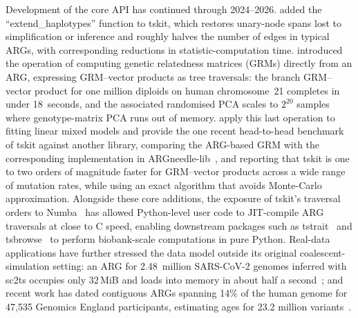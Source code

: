 \documentclass{article}
\begin{document}
Development of the core API has continued through
2024--2026. \citet{fritze2026forest} added the
``extend\_haplotypes'' function to tskit, which restores
unary-node spans lost to simplification or inference and roughly
halves the number of edges in typical ARGs, with corresponding
reductions in statistic-computation time.
\citet{lehmann2026on}
introduced the operation of computing genetic relatedness matrices
(GRMs) directly from an ARG, expressing GRM--vector products as
tree traversals: the branch GRM--vector product for
one million diploids on human chromosome~21 completes in
under 18~seconds, and the associated randomised PCA scales to
$2^{20}$ samples where genotype-matrix PCA runs out of memory.
\citet{lee2026genetic} apply this
last operation to fitting linear mixed models and provide the one recent
head-to-head benchmark of tskit against another library,
comparing the ARG-based GRM with the corresponding implementation
in ARGneedle-lib~\citep{zhang2023biobank},
and reporting that tskit is one to two orders of
magnitude faster for GRM--vector products across a wide range of
mutation rates,
while using an exact algorithm that avoids Monte-Carlo approximation.
Alongside these core additions, the exposure of tskit's
traversal orders to Numba~\citep{lam2015numba} has allowed
Python-level user code to JIT-compile ARG traversals at close to C
speed, enabling downstream packages such as
tstrait~\citep{tagami2024tstrait} and tsbrowse~\citep{karthikeyan2025tsbrowse}
to perform biobank-scale computations in pure Python.
Real-data applications have further stressed the data model
outside its original coalescent-simulation setting: an ARG for
2.48~million SARS-CoV-2 genomes inferred with sc2ts occupies only
32\,MiB and loads into memory in about half a
second~\citep{zhan2025pandemic}; and recent work has dated
contiguous ARGs spanning 14\% of the human genome for 47,535
Genomics England participants, estimating ages for 23.2 million
variants~\citep{pope2026tracing}.
\end{document}
